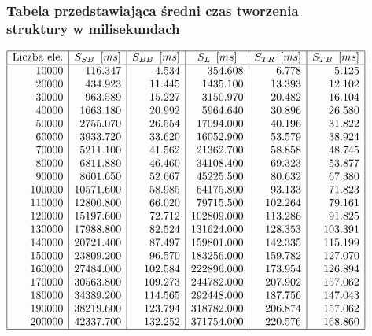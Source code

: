 \documentclass[polish,polish,a4paper]{article}
\begin{document}
\begin{spacing}{1.5}
\begin{figure}[H]
	\subsubsection*{Tabela przedstawiająca średni czas tworzenia struktury w milisekundach}
	\centering
	\begin{equation*}
	\begin{array}{|r|r|r|r|r|r|}
	\hline
	\multicolumn{1}{|c|}{$Liczba ele.$}&\multicolumn{1}{c|}{S_{SB}\enskip[ms]}&\multicolumn{1}{c|}{S_{BB}\enskip[ms]}&\multicolumn{1}{c|}{S_{L}\enskip[ms]}&\multicolumn{1}{c|}{S_{TR}\enskip[ms]}&\multicolumn{1}{c|}{S_{TB}\enskip[ms]}\\ \hline
10000&116.347&4.534&354.608&6.778&5.125\\
20000&434.923&11.445&1435.100&13.393&12.102\\
30000&963.589&15.227&3150.970&20.482&16.104\\
40000&1663.180&20.992&5964.640&30.896&26.580\\
50000&2755.070&26.554&17094.000&40.196&31.822\\
60000&3933.720&33.620&16052.900&53.579&38.924\\
70000&5211.100&41.562&21362.700&58.858&48.745\\
80000&6811.880&46.460&34108.400&69.323&53.877\\
90000&8601.650&52.667&45225.500&80.632&67.380\\
100000&10571.600&58.985&64175.800&93.133&71.823\\
110000&12800.800&66.020&79715.500&102.264&79.161\\
120000&15197.600&72.712&102809.000&113.286&91.825\\
130000&17988.800&82.524&131624.000&128.353&103.391\\
140000&20721.400&87.497&159801.000&142.335&115.199\\
150000&23809.200&96.570&183256.000&159.782&127.070\\
160000&27484.000&102.584&222896.000&173.954&126.894\\
170000&30563.800&109.273&244782.000&207.902&157.062\\
180000&34389.200&114.565&292448.000&187.756&147.043\\
190000&38219.600&123.794&318782.000&206.874&157.062\\
200000&42337.700&132.252&371754.000&220.576&168.860\\\hline
	\end{array}
	\end{equation*}
\end{figure}


\end{spacing}
\end{document}
